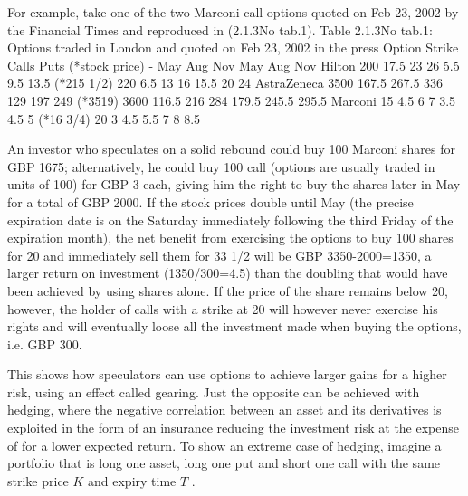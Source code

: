 \documentclass{beamer}
\begin{document}
	\begin{frame}
		For example, take one of the two Marconi call options quoted on Feb 23, 2002 by the Financial Times and reproduced in (2.1.3No tab.1). 
		Table 2.1.3No tab.1: Options traded in London and quoted on Feb 23, 2002 in the press
		Option	 Strike	Calls	Puts
		(*stock price)	 -	 May	 Aug	 Nov	 May	 Aug	 Nov
		Hilton	 200	 17.5	 23	 26	 5.5	 9.5	 13.5
		(*215 1/2)	 220	 6.5	 13	 16	 15.5	 20	 24
		AstraZeneca	 3500	 167.5	 267.5	 336	 129	 197	 249
		(*3519)	 3600	 116.5	 216	 284	 179.5	 245.5	 295.5
		Marconi	 15	 4.5	 6	 7	 3.5	 4.5	 5
		(*16 3/4)	 20	 3	 4.5	 5.5	 7	 8	 8.5
	\end{frame}
	\begin{frame}
		
		An investor who speculates on a solid rebound could buy 100 Marconi shares for GBP 1675; alternatively, he could buy 100 call (options are usually traded in units of 100) for GBP 3 each, giving him the right to buy the shares later in May for a total of GBP 2000. If the stock prices double until May (the precise expiration date is on the Saturday immediately following the third Friday of the expiration month), the net benefit from exercising the options to buy 100 shares for 20 and immediately sell them for 33 1/2 will be GBP 3350-2000=1350, a larger return on investment (1350/300=4.5) than the doubling that would have been achieved by using shares alone. If the price of the share remains below 20, however, the holder of calls with a strike at 20 will however never exercise his rights and will eventually loose all the investment made when buying the options, i.e. GBP 300.
	\end{frame}
	\begin{frame}
		This shows how speculators can use options to achieve larger gains for a higher risk, using an effect called gearing. Just the opposite can be achieved with hedging, where the negative correlation between an asset and its derivatives is exploited in the form of an insurance reducing the investment risk at the expense of for a lower expected return. To show an extreme case of hedging, imagine a portfolio that is long one asset, long one put and short one call with the same strike price $ K$ and expiry time $ T$ . 
	\end{frame}
\end{document}
